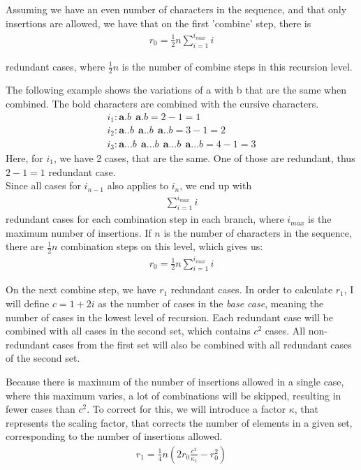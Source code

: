 \documentclass[12pt]{article}
\theoremstyle{definition}
\begin{document}
Assuming we have an even number of characters in the sequence, and that only insertions are allowed, we have that on the first 'combine' step, there is
\begin{eqnarray}
	\label{r_0}
	r_0 = \frac{1}{2}n\sum^{i_{max}}_{i=1} i
\end{eqnarray}

redundant cases, where $\frac{1}{2}n$ is the number of combine steps in this recursion level.

\begin{example}
The following example shows the variations of a with b that are the same when combined. The bold characters are combined with the cursive characters.
\begin{eqnarray}
	i_{1}: \textbf{a.}b\ \ \textbf{a}.b = 2 - 1 = 1 \\
	i_{2}: \textbf{a..}b\ \ \textbf{a.}.b\ \ \textbf{a}..b = 3 - 1 = 2 \\
	i_{3}: \textbf{a...}b\ \ \textbf{a..}.b\ \ \textbf{a.}..b\ \ \textbf{a}...b = 4 - 1 = 3
\end{eqnarray}
Here, for $i_{1}$, we have 2 cases, that are the same. One of those are redundant, thus $2 - 1 = 1$ redundant case. \\
Since all cases for $i_{n-1}$ also applies to $i_{n}$, we end up with
\begin{eqnarray}
	\sum_{i=1}^{i_{max}}i
\end{eqnarray}
redundant cases for each combination step in each branch, where $i_{max}$ is the maximum number of insertions. If $n$ is the number of characters in the sequence, there are $\frac{1}{2}n$ combination steps on this level, which gives us:
\begin{eqnarray}
	r_0 = \frac{1}{2}n\sum^{i_{max}}_{i=1} i
\end{eqnarray}
\end{example}

On the next combine step, we have $r_1$ redundant cases. In order to calculate $r_1$, I will define $c = 1 + 2i$ as the number of cases in the \textit{base case}, meaning the number of cases in the lowest level of recursion. Each redundant case will be combined with all cases in the second set, which contains $c^2$ cases. All non-redundant cases from the first set will also be combined with all redundant cases of the second set. 

Because there is maximum of the number of insertions allowed in a single case, where this maximum varies, a lot of combinations will be skipped, resulting in fewer cases than $c^2$. To correct for this, we will introduce a factor $\kappa$, that represents the scaling factor, that corrects the number of elements in a given set, corresponding to the number of insertions allowed.
\begin{eqnarray}
	\label{r_1}
	r_1 = \frac{1}{4}n(2r_0\frac{c^2}{\kappa_1} - r_0^2)
\end{eqnarray}
\end{document}
